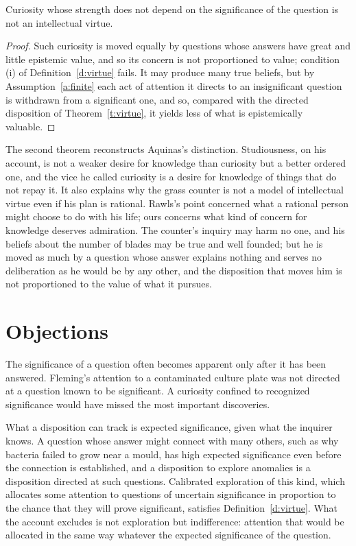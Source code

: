 \documentclass{situationist-preprint}
\begin{document}
\begin{theorem}\label{t:indisc}
Curiosity whose strength does not depend on the significance of the question is not an intellectual virtue.
\end{theorem}

\begin{proof}
Such curiosity is moved equally by questions whose answers have great and little epistemic value, and so its concern is not proportioned to value; condition (i) of Definition~\ref{d:virtue} fails. It may produce many true beliefs, but by Assumption~\ref{a:finite} each act of attention it directs to an insignificant question is withdrawn from a significant one, and so, compared with the directed disposition of Theorem~\ref{t:virtue}, it yields less of what is epistemically valuable.
\end{proof}

The second theorem reconstructs Aquinas's distinction. Studiousness, on his account, is not a weaker desire for knowledge than curiosity but a better ordered one, and the vice he called curiosity is a desire for knowledge of things that do not repay it. It also explains why the grass counter is not a model of intellectual virtue even if his plan is rational. Rawls's point concerned what a rational person might choose to do with his life; ours concerns what kind of concern for knowledge deserves admiration. The counter's inquiry may harm no one, and his beliefs about the number of blades may be true and well founded; but he is moved as much by a question whose answer explains nothing and serves no deliberation as he would be by any other, and the disposition that moves him is not proportioned to the value of what it pursues.

\section{Objections}

\begin{objection}
The significance of a question often becomes apparent only after it has been answered. Fleming's attention to a contaminated culture plate was not directed at a question known to be significant. A curiosity confined to recognized significance would have missed the most important discoveries.
\end{objection}

\begin{reply}
What a disposition can track is expected significance, given what the inquirer knows. A question whose answer might connect with many others, such as why bacteria failed to grow near a mould, has high expected significance even before the connection is established, and a disposition to explore anomalies is a disposition directed at such questions. Calibrated exploration of this kind, which allocates some attention to questions of uncertain significance in proportion to the chance that they will prove significant, satisfies Definition~\ref{d:virtue}. What the account excludes is not exploration but indifference: attention that would be allocated in the same way whatever the expected significance of the question.
\end{reply}
\end{document}
